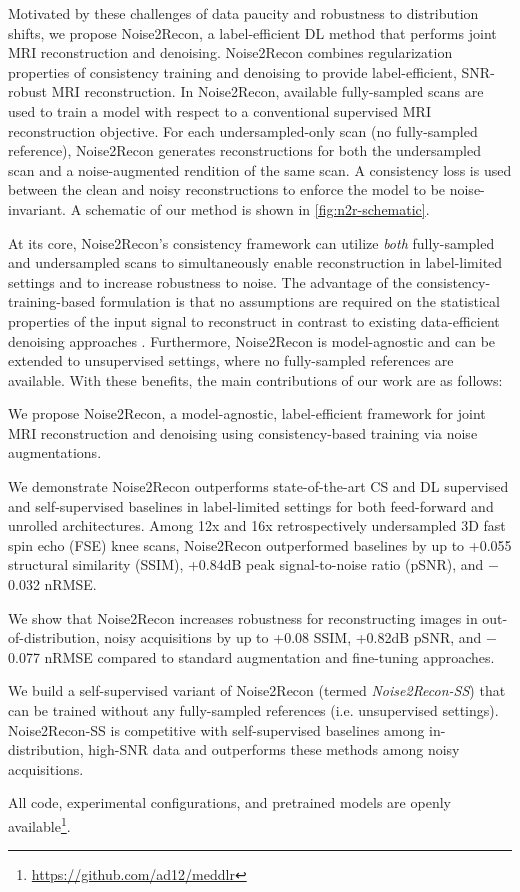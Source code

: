 \documentclass[10pt,twocolumn,letterpaper]{article}
\newcommand{\RV}[1]{{#1}}
\begin{document}
Motivated by these challenges of data paucity and robustness to distribution shifts, we propose Noise2Recon, a label-efficient DL method that performs joint MRI reconstruction and denoising. \RV{Noise2Recon combines regularization properties of consistency training \cite{uda, sohn2020fixmatch} and denoising \cite{batson2019noise2self, moran2020noisier2noise} to provide label-efficient, SNR-robust MRI reconstruction.} In Noise2Recon, available fully-sampled scans are used to train a model with respect to a conventional supervised MRI reconstruction objective. For each undersampled-only scan (no fully-sampled reference), Noise2Recon generates reconstructions for both the undersampled scan and a noise-augmented rendition of the same scan. A consistency loss is used between the clean and noisy reconstructions to enforce the model to be noise-invariant. A schematic of our method is shown in \cref{fig:n2r-schematic}.

At its core, Noise2Recon's consistency framework can utilize \textit{both} fully-sampled and undersampled scans to simultaneously enable reconstruction in label-limited settings and to increase robustness to noise. The advantage of the consistency-training-based formulation is that no assumptions are required on the statistical properties of the input signal to reconstruct in contrast to existing data-efficient denoising approaches \cite{lehtinen2018noise2noise, batson2019noise2self,hendriksen2020noise2inverse}. Furthermore, \RV{Noise2Recon is model-agnostic and can be extended to unsupervised settings, where no fully-sampled references are available}. With these benefits, the main contributions of our work are as follows: 
\vspace{-0.5em}
\begin{enumerate}
    \item We propose Noise2Recon, a model-agnostic, label-efficient framework for joint MRI reconstruction and denoising using consistency-based training via noise augmentations. 
    \item We demonstrate Noise2Recon outperforms state-of-the-art CS and DL supervised and self-supervised baselines in label-limited settings for both feed-forward and unrolled architectures. Among 12x and 16x retrospectively undersampled 3D fast spin echo (FSE) knee scans, Noise2Recon outperformed baselines by up to +0.055 structural similarity (SSIM), +0.84dB peak signal-to-noise ratio (pSNR), and $-$0.032 nRMSE.
    \item We show \RV{that} Noise2Recon increases robustness for reconstructing images in out-of-distribution, noisy acquisitions by up to \RV{+0.08 SSIM}, +0.82dB pSNR, \RV{and $-$0.077 nRMSE} compared to standard augmentation and fine-tuning approaches.
    \RV{\item We build a self-supervised variant of Noise2Recon (termed \textit{Noise2Recon-SS}) that can be trained without any fully-sampled references (i.e. unsupervised settings). Noise2Recon-SS is competitive with self-supervised baselines among in-distribution, high-SNR data and outperforms these methods among noisy acquisitions.}
\end{enumerate}
All code, experimental configurations, and pretrained models are openly available\footnote{\url{https://github.com/ad12/meddlr}}.
\end{document}
